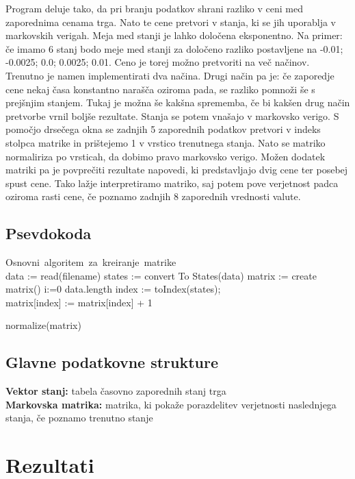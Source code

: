 \documentclass[a4paper,11pt]{article}
\begin{document}
Program deluje tako, da pri branju podatkov shrani razliko v ceni med zaporednima cenama trga. Nato te cene pretvori v stanja, ki se jih uporablja v markovskih verigah. Meja med stanji je lahko določena eksponentno. Na primer: če imamo 6 stanj bodo meje med stanji za določeno razliko postavljene na -0.01; -0.0025; 0.0; 0.0025; 0.01. Ceno je torej možno pretvoriti na več načinov. Trenutno je namen implementirati dva načina. Drugi način pa je: če zaporedje cene nekaj časa konstantno narašča oziroma pada, se razliko pomnoži še s prejšnjim stanjem. Tukaj je možna še kakšna sprememba, če bi kakšen drug način pretvorbe vrnil boljše rezultate. Stanja se potem vnašajo v markovsko verigo. S pomočjo drsečega okna se zadnjih 5 zaporednih podatkov pretvori v indeks stolpca matrike in prištejemo 1 v vrstico trenutnega stanja. Nato se matriko normaliriza  po vrsticah, da dobimo pravo markovsko verigo. Možen dodatek matriki pa je povprečiti rezultate napovedi, ki predstavljajo dvig cene ter posebej spust cene. Tako lažje interpretiramo matriko, saj potem pove verjetnost padca oziroma rasti cene, če poznamo zadnjih 8 zaporednih vrednosti valute.

\subsection{Psevdokoda}

\begin{program}
\mbox{Osnovni algoritem za kreiranje matrike}
\BEGIN \\
 data := read(filename)\; 
 states := convert To States(data)\; 
 matrix := create matrix()\; 
\FOR i:=0 \TO data.length  \DO
     index := toIndex(states); \\
  matrix[index] := matrix[index] + 1\; \OD %

 normalize(matrix)\;
\END
\end{program}

\subsection{Glavne podatkovne strukture}
\textbf{Vektor stanj:} tabela časovno zaporednih stanj trga \\
\textbf{Markovska matrika: } matrika, ki pokaže porazdelitev verjetnosti naslednjega stanja, če poznamo trenutno stanje


\section{Rezultati}
\end{document}
